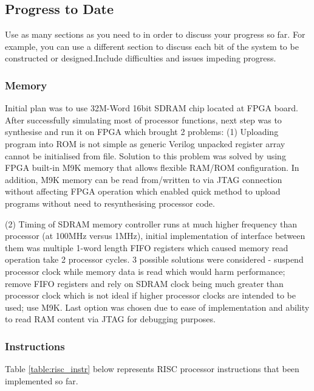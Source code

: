\documentclass[a4paper,12pt]{article}
\begin{document}
\begin{multicols}{2}

\subsection{Progress to Date}
Use as many sections as you need to in order to discuss your progress so far. For example, you can use a different section to discuss each bit of the system to be constructed or designed.Include difficulties and issues impeding progress.


\subsubsection{Memory}
Initial plan was to use 32M-Word 16bit SDRAM chip located at FPGA board. After successfully simulating most of processor functions, next step was to synthesise and run it on FPGA which brought 2 problems: (1) Uploading program into ROM is not simple as generic Verilog unpacked register array cannot be initialised from file. Solution to this problem was solved by using FPGA built-in M9K memory that allows flexible RAM/ROM configuration. In addition, M9K memory can be read from/written to via JTAG connection without affecting FPGA operation which enabled quick method to upload programs without need to resynthesising processor code.

(2) Timing of SDRAM memory controller runs at much higher frequency than processor (at 100MHz versus 1MHz), initial implementation of interface between them was multiple 1-word length FIFO registers which caused memory read operation take 2 processor cycles. 3 possible solutions were considered - suspend processor clock while memory data is read which would harm performance; remove FIFO registers and rely on SDRAM clock being much greater than processor clock which is not ideal if higher processor clocks are intended to be used; use M9K. Last option was chosen due to ease of implementation and ability to read RAM content via JTAG for debugging purposes.

\end{multicols}
\newpage
\subsubsection{Instructions}
Table \ref{table:risc_instr} below represents RISC processor instructions that been implemented so far.
\end{document}

